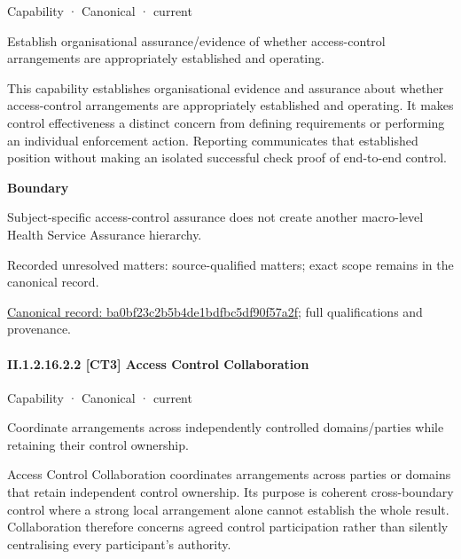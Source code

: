 \label{element:ba0bf23c2b5b4de1bdfbc5df90f57a2f}
{\small Capability · Canonical · current}\par

Establish organisational assurance/evidence of whether access-control arrangements are appropriately established and operating.



This capability establishes organisational evidence and assurance about whether access-control arrangements are appropriately established and operating. It makes control effectiveness a distinct concern from defining requirements or performing an individual enforcement action. Reporting communicates that established position without making an isolated successful check proof of end-to-end control.



\textbf{Boundary}



Subject-specific access-control assurance does not create another macro-level Health Service Assurance hierarchy.


{\small Recorded unresolved matters: source-qualified matters; exact scope remains in the canonical record.}\par
{\footnotesize \href{../../../../../../../continuum/strategy/capability/ba0bf23c2b5b4de1bdfbc5df90f57a2f.md}{Canonical record: ba0bf23c2b5b4de1bdfbc5df90f57a2f}; full qualifications and provenance.}\par
\paragraph*{II.1.2.16.2.2 [CT3] Access Control Collaboration}
\label{navigation:II.1.2.16.2.2}

\label{element:c1a39b83d27a4a148f997c0a709e82ac}
{\small Capability · Canonical · current}\par

Coordinate arrangements across independently controlled domains/parties while retaining their control ownership.



Access Control Collaboration coordinates arrangements across parties or domains that retain independent control ownership. Its purpose is coherent cross-boundary control where a strong local arrangement alone cannot establish the whole result. Collaboration therefore concerns agreed control participation rather than silently centralising every participant's authority.



